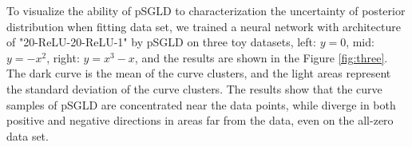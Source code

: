 To visualize the ability of pSGLD to characterization the uncertainty of posterior distribution when fitting data set, we trained a neural network with architecture of "20-ReLU-20-ReLU-1" by pSGLD on three toy datasets, left: $y=0$, mid: $y=-x^2$, right: $y=x^3-x$, and the results are shown in the Figure \ref{fig:three}. The dark curve is the mean of the curve clusters, and the light areas represent the standard deviation of the curve clusters. The results show that the curve samples of pSGLD are concentrated near the data points, while diverge in both positive and negative directions in areas far from the data, even on the all-zero data set.

